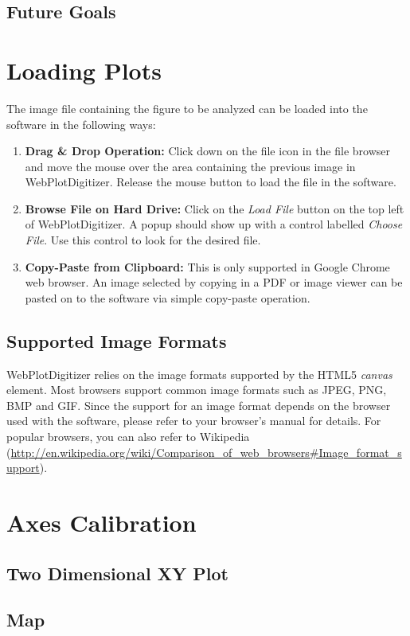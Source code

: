 \documentclass[letterpaper]{article}
\begin{document}
\subsection{Future Goals}

\section{Loading Plots}
The image file containing the figure to be analyzed can be loaded into the software in the following ways:
\begin{enumerate}
\item{{\bf Drag \& Drop Operation:} Click down on the file icon in the file browser and move the mouse over the area containing the previous image in WebPlotDigitizer. Release the mouse button to load the file in the software.}
\item{{\bf Browse File on Hard Drive:} Click on the \emph{Load File} button on the top left of WebPlotDigitizer. A popup should show up with a control labelled \emph{Choose File}. Use this control to look for the desired file.}
\item{{\bf Copy-Paste from Clipboard:} This is only supported in Google Chrome web browser. An image selected by copying in a PDF or image viewer can be pasted on to the software via simple copy-paste operation.}
\end{enumerate}

\subsection{Supported Image Formats}
WebPlotDigitizer relies on the image formats supported by the HTML5 \emph{canvas} element. Most browsers support common image formats such as JPEG, PNG, BMP and GIF. Since the support for an image format depends on the browser used with the software, please refer to your browser's manual for details. For popular browsers, you can also refer to Wikipedia (\url{http://en.wikipedia.org/wiki/Comparison_of_web_browsers#Image_format_support}).

\section{Axes Calibration}
\subsection{Two Dimensional XY Plot}
\subsection{Map}
\end{document}

